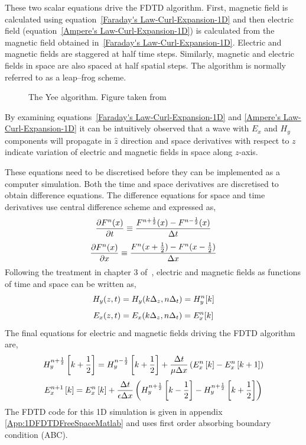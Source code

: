 These two scalar equations drive the FDTD algorithm. First, magnetic field is calculated using equation~\ref{Faraday's Law-Curl-Expansion-1D} and then electric field (equation~\ref{Ampere's Law-Curl-Expansion-1D}) is calculated from the magnetic field obtained in~\ref{Faraday's Law-Curl-Expansion-1D}. Electric and magnetic fields are staggered at half time steps. Similarly, magnetic and electric fields in space are also spaced at half spatial steps. The algorithm is normally referred to as a leap--frog scheme.
\begin{figure}[here]
\centering
\caption{The Yee algorithm. Figure taken from~\cite{JBSchneiderUFDTD}}
\label{Algorithm}
\end{figure}
By examining equations~\ref{Faraday's Law-Curl-Expansion-1D} and \ref{Ampere's Law-Curl-Expansion-1D} it can be intuitively observed that a wave with $E_x$ and $H_y$ components will propagate in $\hat{z}$ direction and space derivatives with respect to $z$ indicate variation of electric and magnetic fields in space along $z$-axis.

These equations need to be discretised before they can be implemented as a computer simulation. Both the time and space derivatives are discretised to obtain difference equations. The difference equations for space and time derivatives use central difference scheme and expressed as,
\begin{equation}
\centering
\dfrac{\partial F^n(x)}{\partial t} \equiv \dfrac{F^{n+\frac{1}{2}}(x)-F^{n-\frac{1}{2}}(x)}{\Delta t}
\label{central-difference-time}
\end{equation}
\begin{equation}
\centering
\dfrac{\partial F^n(x)}{\partial x} \equiv \dfrac{F^n(x+\frac{1}{2})-F^n(x-\frac{1}{2})}{\Delta x}
\label{central-difference-space}
\end{equation}
Following the treatment in chapter 3 of~\cite{JBSchneiderUFDTD}, electric and magnetic fields as functions of time and space can be written as,
\begin{equation}
\centering
H_y (z,t)=H_y (k\Delta _z,n\Delta _t)=H^n_y[k]
\label{Hy-of-z_and_t}
\end{equation}
\begin{equation}
\centering
E_x (z,t)=E_x (k\Delta _z,n\Delta _t)=E^n_x[k]
\label{Ex-of-z_and_t}
\end{equation}
The final equations for electric and magnetic fields driving the FDTD algorithm are,
\begin{equation}
\centering
H^{n+\frac{1}{2}}_y \left[k+\frac{1}{2}\right]=H^{n-\frac{1}{2}}_y \left[k+\frac{1}{2}\right] + \dfrac{\Delta t}{\mu \Delta x} \left( E^{n}_x \left[k\right] - E^{n}_x \left[k+1\right] \right)
\label{Hy-1D-Simple-FDTD-Driver}
\end{equation}
\begin{equation}
\centering
E^{n+1}_x \left[k\right]=E^{n}_x \left[k\right] + \dfrac{\Delta t}{\epsilon \Delta x} \left( H^{n+\frac{1}{2}}_y \left[k-\frac{1}{2}\right] - H^{n+\frac{1}{2}}_y \left[k+\frac{1}{2}\right] \right)
\label{Ex-1D-Simple-FDTD-Driver}
\end{equation}
The FDTD code for this 1D simulation is given in appendix \ref{App:1DFDTDFreeSpaceMatlab} and uses first order absorbing boundary condition (ABC).

